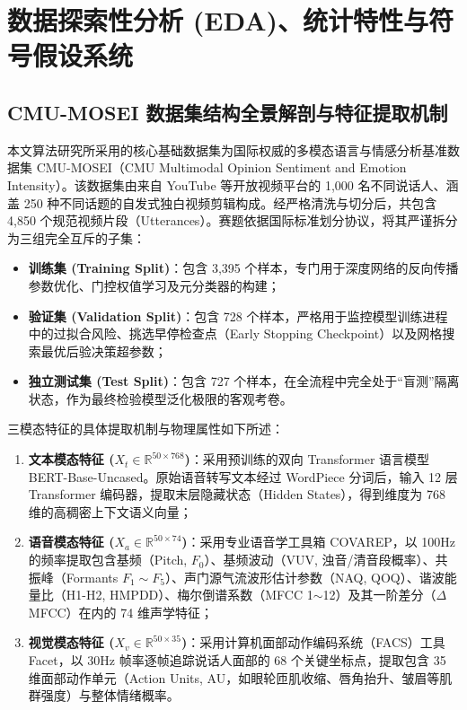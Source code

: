 \section{数据探索性分析 (EDA)、统计特性与符号假设系统}

\subsection{CMU-MOSEI 数据集结构全景解剖与特征提取机制}
本文算法研究所采用的核心基础数据集为国际权威的多模态语言与情感分析基准数据集 CMU-MOSEI（CMU Multimodal Opinion Sentiment and Emotion Intensity）\cite{zadeh2018multimodal}。该数据集由来自 YouTube 等开放视频平台的 1,000 名不同说话人、涵盖 250 种不同话题的自发式独白视频剪辑构成。经严格清洗与切分后，共包含 4,850 个规范视频片段（Utterances）。赛题依据国际标准划分协议，将其严谨拆分为三组完全互斥的子集：
\begin{itemize}
    \item \textbf{训练集 (Training Split)}：包含 3,395 个样本，专门用于深度网络的反向传播参数优化、门控权值学习及元分类器的构建；
    \item \textbf{验证集 (Validation Split)}：包含 728 个样本，严格用于监控模型训练进程中的过拟合风险、挑选早停检查点（Early Stopping Checkpoint）以及网格搜索最优后验决策超参数；
    \item \textbf{独立测试集 (Test Split)}：包含 727 个样本，在全流程中完全处于“盲测”隔离状态，作为最终检验模型泛化极限的客观考卷。
\end{itemize}

三模态特征的具体提取机制与物理属性如下所述：
\begin{enumerate}
    \item \textbf{文本模态特征 ($X_t \in \mathbb{R}^{50 \times 768}$)}：采用预训练的双向 Transformer 语言模型 BERT-Base-Uncased\cite{devlin2018bert}。原始语音转写文本经过 WordPiece 分词后，输入 12 层 Transformer 编码器，提取末层隐藏状态（Hidden States），得到维度为 768 维的高稠密上下文语义向量；
    \item \textbf{语音模态特征 ($X_a \in \mathbb{R}^{50 \times 74}$)}：采用专业语音学工具箱 COVAREP\cite{zadeh2018multimodal}，以 100Hz 的频率提取包含基频（Pitch, $F_0$）、基频波动（VUV, 浊音/清音段概率）、共振峰（Formants $F_1 \sim F_5$）、声门源气流波形估计参数（NAQ, QOQ）、谐波能量比（H1-H2, HMPDD）、梅尔倒谱系数（MFCC 1$\sim$12）及其一阶差分（$\Delta$MFCC）在内的 74 维声学特征；
    \item \textbf{视觉模态特征 ($X_v \in \mathbb{R}^{50 \times 35}$)}：采用计算机面部动作编码系统（FACS）工具 Facet，以 30Hz 帧率逐帧追踪说话人面部的 68 个关键坐标点，提取包含 35 维面部动作单元（Action Units, AU，如眼轮匝肌收缩、唇角抬升、皱眉等肌群强度）与整体情绪概率。
\end{enumerate}

